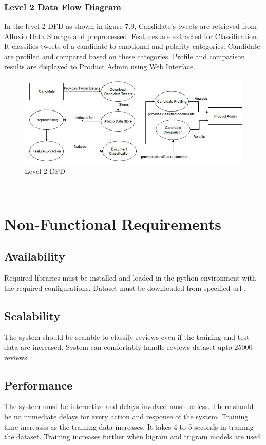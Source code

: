 \documentclass[oneside,a4paper,12pt]{pictreport}
\begin{document}
\subsubsection{Level 2 Data Flow Diagram}
In the level 2 DFD as shown in figure 7.9, Candidate's tweets are retrieved from Alluxio Data Storage and preprocessed. Features are extracted for Classification. It classifies tweets of a candidate to emotional and polarity categories. Candidate are profiled and compared based on these categories. Profile and comparison results are displayed to Product Admin using Web Interface.\\
\begin{figure}[h!]
\includegraphics[width=4.5in]{DFD-2.jpg}
\caption{Level 2 DFD}
\end{figure}
\\
\section{Non-Functional Requirements}
\subsection{Availability}
Required libraries must be installed and loaded in the python environment with the required configurations. Dataset must be downloaded from specified url \cite{dataset}.

\subsection{Scalability}
The system should be scalable to classify reviews even if the training and test data are increased. System can comfortably handle 
reviews dataset upto 25000 reviews.

\subsection{Performance}
The system must be interactive and delays involved must be less. There should be no immediate delays for every action and response of the system. Training time increases as the training data increases. It takes 4 to 5 seconds in training the dataset. Training increases further when bigram and trigram models are used.
\end{document}
